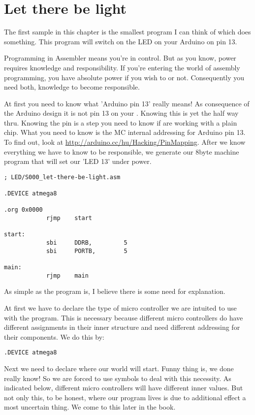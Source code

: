 \section{Let there be light}

The first sample in this chapter is the smallest program I can think of which does something.
This program will switch on the LED on your Arduino on pin 13.

Programming in Assembler means you're in control. But as you know, power requires knowledge and responsibility. If you're entering the world of assembly programming, you have absolute power if you wish to or not. Consequently you need both, knowledge to become responsible.

At first you need to know what 'Arduino pin 13' really means! As consequence of the Arduino design it is not pin 13 on your \at. Knowing this is yet the half way thru. Knowing the pin is a step you need to know if are working with a plain chip. What you need to know is the MC internal addressing for Arduino pin 13. To find out, look at \url{http://arduino.cc/hu/Hacking/PinMapping}. After we know everything we have to know to be responsible, we generate our 8byte machine program that will set our 'LED 13' under power.

\begin{lstlisting}
; LED/S000_let-there-be-light.asm

.DEVICE atmega8

.org 0x0000
            rjmp    start 

start:
            sbi     DDRB,         5
            sbi     PORTB,        5
            
main:
            rjmp    main
\end{lstlisting}

As simple as the program is, I believe there is some need for explanation.

At first we have to declare the type of micro controller we are intuited to use with the program. This is necessary because different micro controllers do have different assignments in their inner structure and need different addressing for their components. We do this by:

\begin{lstlisting}
.DEVICE atmega8
\end{lstlisting}

Next we need to declare where our world will start. Funny thing is, we done really know! So we are forced to use symbols to deal with this necessity. As indicated below, different micro controllers will have different inner values. But not only this, to be honest, where our program lives is due to additional effect a most uncertain thing. We come to this later in the book.

